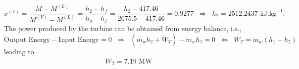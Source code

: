 \documentclass[calculator,allquestions,datasheet,mock,solutions]{exam_newMarcus2}
\newcommand{\frc}{\displaystyle\frac}
\newcommand{\mfr}[3][error]{#1_{#2}^{\left(#3\right)}}
\begin{document}
\begin{question}
\begin{enumerate}[(a)]
\begin{enumerate}
{                       \begin{displaymath}
                          \mfr[x]{}{V} = \frc{M-\mfr[M]{}{L}}{\mfr[M]{}{V} - \mfr[M]{}{L}} = \frc{h_{2}-h_{f}}{h_{g}-h_{f}} = \frc{h_{2}-417.46}{2675.5-417.46} = 0.9277\;\;\Rightarrow\;\; h_{2} = 2512.2437\text{ kJ.kg}^{-1}.
                       \end{displaymath}
                       The power produced by the turbine can be obtained from energy balance, i.e.,
                        \begin{displaymath}
                            \text{Output Energy} - \text{Input Energy} = 0 \;\;\Rightarrow\;\; \left(\dot{m}_{w}h_{2}+\dot{W}_{T}\right) - \dot{m}_{w}h_{1} = 0\;\;\Leftrightarrow\;\; \dot{W}_{T} = \dot{m}_{w}\left(h_{1}-h_{2}\right)
                        \end{displaymath}
                        leading to~
                        \begin{displaymath}
                           \dot{W}_{T} = 7.19\text{ MW}
                        \end{displaymath}
                  }
          \end{enumerate}
                         
\end{enumerate}

\end{question}


\vfill
\paperend



\vfill 



{
  
  
}
\end{document}
